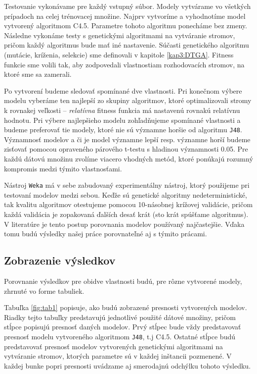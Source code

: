 Testovanie vykonávame pre každý vstupný súbor. Modely vytvárame vo všetkých prípadoch na celej trénovacej množine. Najprv vytvoríme a vyhodnotíme model vytvorený algoritmom C4.5. Parametre tohoto algoritmu ponecháme bez zmeny. Následne vykonáme testy s genetickými algoritmami na vytváranie stromov, pričom každý algoritmus bude mať iné nastavenie. Súčasti genetického algoritmu (mutácie, kríženia, selekcie) sme definovali v kapitole \ref{kap3:DTGA}. Fitness funkcie sme volili tak, aby zodpovedali vlastnostiam rozhodovacích stromov, na ktoré sme sa zamerali.

Po vytvorení budeme sledovať spomínané dve vlastnosti. Pri konečnom výbere modelu vyberáme ten najlepší zo skupiny algoritmov, ktoré optimalizovali stromy k rovnakej veľkosti -- \emph{relatívna} fitness funkcia má nastavenú rovnakú relatívnu hodnotu. Pri výbere najlepšieho modelu zohľadňujeme spomínané vlastnosti a budeme preferovať tie modely, ktoré nie sú významne horšie od algoritmu \verb|J48|. Významnosť modelov a či je model významne lepší resp. významne horší budeme zisťovať pomocou opraveného párového t-testu s hladinou významnosti 0.05. Pre každú dátovú množinu zvolíme viacero vhodných metód, ktoré ponúkajú rozumný kompromis medzi týmito vlastnosťami.

Nástroj \verb|Weka| má v sebe zabudovaný experimentálny nástroj, ktorý použijeme pri testovaní modelov medzi sebou. Keďže sú genetické algoritmy nedeterministické, tak kvalitu algoritmov otestujeme pomocou 10-násobnej krížovej validácie, pričom každá validácia je zopakovaná ďalších desať krát (sto krát spúšťame algoritmus). V literatúre je tento postup porovnania modelov používaný najčastejšie. Vďaka tomu budú výsledky našej práce porovnateľné aj s týmito prácami.

\subsection{Zobrazenie výsledkov}
Porovnanie výsledkov pre obidve vlastnosti budú, pre rôzne vytvorené modely, zhrnuté vo forme tabuliek.

Tabuľka \ref{fig:tab1} popisuje, ako budú zobrazené presnosti vytvorených modelov. Riadky tejto tabuľky predstavujú jednotlivé použité dátové množiny, pričom stĺpce popisujú presnosť daných modelov. Prvý stĺpec bude vždy predstavovať presnosť modelu vytvoreného algoritmom \verb|J48|, t.j C4.5. Ostatné stĺpce budú predstavovať presnosť modelov vytvorených genetickými algoritmami na vytváranie stromov, ktorých parametre sú v každej inštancii pozmenené. V každej bunke popri presnosti uvádzame  aj smerodajnú odchýlku tohoto výsledku.

